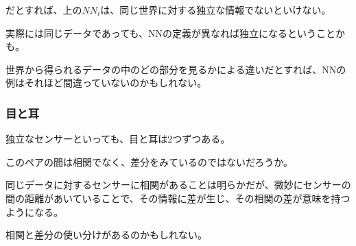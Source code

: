 \documentclass[10pt, oneside]{jarticle}   	%
\begin{document}
だとすれば、上の$NN_i$は、同じ世界に対する独立な情報でないといけない。

実際には同じデータであっても、NNの定義が異なれば独立になるということかも。

世界から得られるデータの中のどの部分を見るかによる違いだとすれば、NNの例はそれほど間違っていないのかもしれない。
\subsubsection{目と耳}
独立なセンサーといっても、目と耳は2つずつある。　

このペアの間は相関でなく、差分をみているのではないだろうか。

同じデータに対するセンサーに相関があることは明らかだが、微妙にセンサーの間の距離があいていることで、その情報に差が生じ、その相関の差が意味を持つようになる。

相関と差分の使い分けがあるのかもしれない。
\end{document}
